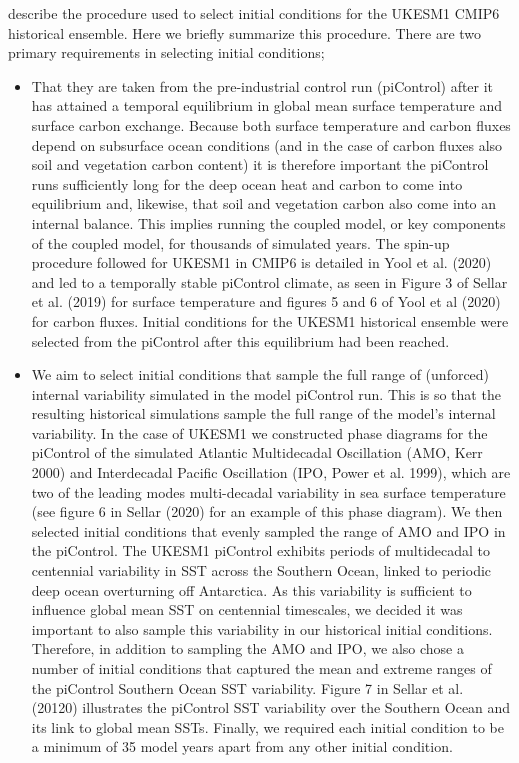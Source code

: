 \documentclass[bg, manuscript]{copernicus}
\begin{document}
\citet{sellar2020implementation} describe the procedure used to select initial conditions for the UKESM1 CMIP6 historical ensemble. Here we briefly summarize this procedure. There are two primary requirements in selecting initial conditions;
\begin{itemize}
    \item That they are taken from the pre-industrial control run (piControl) after it has attained a temporal equilibrium in global mean surface temperature and surface carbon exchange. Because both surface temperature and carbon fluxes depend on subsurface ocean conditions (and in the case of carbon fluxes also soil and vegetation carbon content) it is therefore important the piControl runs sufficiently long for the deep ocean heat and carbon to come into equilibrium and, likewise, that soil and vegetation carbon also come into an internal balance. This implies running the coupled model, or key components of the coupled model, for thousands of simulated years. The spin-up procedure followed for UKESM1 in CMIP6 is detailed in Yool et al. (2020) and led to a temporally stable piControl climate, as seen in Figure 3 of Sellar et al. (2019) for surface temperature and figures 5 and 6 of Yool et al (2020) for carbon fluxes. Initial conditions for the UKESM1 historical ensemble were selected from the piControl after this equilibrium had been reached.
    \item We aim to select initial conditions that sample the full range of (unforced) internal variability simulated in the model piControl run. This is so that the resulting historical simulations sample the full range of the model’s internal variability. In the case of UKESM1 we constructed phase diagrams for the piControl of the simulated Atlantic Multidecadal Oscillation (AMO, Kerr 2000) and Interdecadal Pacific Oscillation (IPO, Power et al. 1999), which are two of the leading modes multi-decadal variability in sea surface temperature (see figure 6 in Sellar (2020) for an example of this phase diagram). We then selected initial conditions that evenly sampled the range of AMO and IPO in the piControl. The UKESM1 piControl exhibits periods of multidecadal to centennial variability in SST across the Southern Ocean, linked to periodic deep ocean overturning off Antarctica. As this variability is sufficient to influence global mean SST on centennial timescales, we decided it was important to also sample this variability in our historical initial conditions. Therefore, in addition to sampling the AMO and IPO, we also chose a number of initial conditions that captured the mean and extreme ranges of the piControl Southern Ocean SST variability. Figure 7 in Sellar et al. (20120) illustrates the piControl SST variability over the Southern Ocean and its link to global mean SSTs. Finally, we required each initial condition to be a minimum of 35 model years apart from any other initial condition.
\end{itemize}
 
\end{document}
